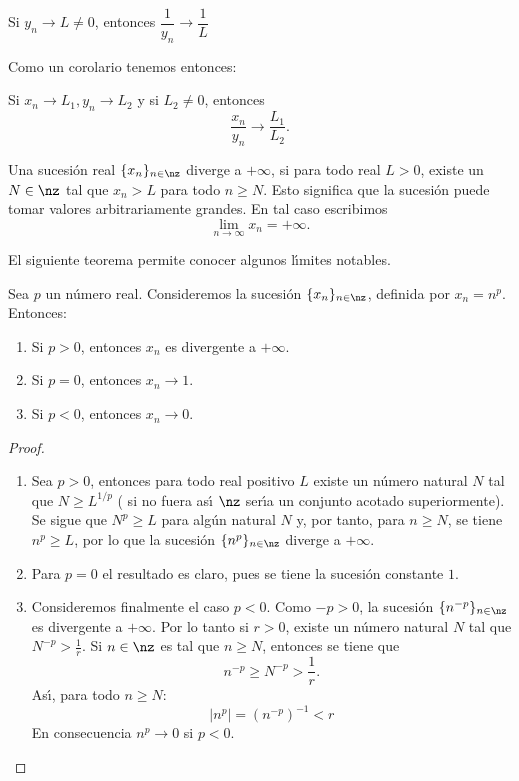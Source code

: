 \begin{theorem}
Si $y_{n}\rightarrow L\neq0$, entonces $\dfrac{1}{y_{n}}\rightarrow\dfrac
{1}{L}$
\end{theorem}

Como un corolario tenemos entonces:

\begin{corollary}
Si $x_{n}\to L_{1}, y_{n}\to L_{2}$ y si $L_{2}\neq0$, entonces
\[
\frac{x_{n}}{y_{n}}\to\frac{L_{1}}{L_{2}}.
\]

\end{corollary}

Una sucesi\'{o}n real $\{x_{n}\}_{n\in\nz}$ diverge a $+\infty$, si para todo
real $L>0$, existe un $N\in\nz$ tal que $x_{n}>L$ para todo $n\geq N$. Esto
significa que la sucesi\'{o}n puede tomar va\-lores arbitrariamente grandes.
En tal caso escribimos
\[
\lim_{n\rightarrow\infty}x_{n}=+\infty.
\]


El siguiente teorema permite conocer algunos l\'{\i}mites notables.

\begin{theorem}
\label{enealap} Sea $p$ un n\'{u}mero real. Consideremos la sucesi\'{o}n
$\{x_{n}\}_{n\in\nz}$, definida por $x_{n}=n^{p}$. Entonces:

\begin{enumerate}
\item Si $p>0$, entonces $x_{n}$ es divergente a $+\infty$.

\item Si $p=0$, entonces $x_{n}\rightarrow1$.

\item Si $p<0$, entonces $x_{n}\rightarrow0$.
\end{enumerate}
\end{theorem}

\begin{proof}
\begin{enumerate}
\item Sea $p>0$, entonces para todo real positivo $L$ existe un n\'{u}mero
natural $N$ tal que $N\geq L^{1/p}$ ( si no fuera as\'{\i} $\nz$ ser\'{\i}a un
conjunto acotado superiormente). Se sigue que $N^{p}\geq L$ para alg\'{u}n
natural $N$ y, por tanto, para $n\geq N$, se tiene $n^{p}\geq L$, por lo que
la sucesi\'{o}n $\{n^{p}\}_{n\in\nz}$ diverge a $+\infty$.

\item Para $p=0$ el resultado es claro, pues se tiene la sucesi\'{o}n
constante $1$.

\item Consideremos finalmente el caso $p<0$. Como $-p>0$, la sucesi\'{o}n
$\{n^{-p}\}_{n\in\nz}$ es divergente a $+\infty$. Por lo tanto si $r>0$,
existe un n\'{u}mero natural $N$ tal que $N^{-p}>\frac{1}{r}$. Si $n\in\nz$ es
tal que $n\geq N$, entonces se tiene que
\[
n^{-p}\geq N^{-p}>\frac{1}{r}.
\]
As\'{\i}, para todo $n\geq N$:
\[
|n^{p}|=(n^{-p})^{-1}<r
\]
En consecuencia $n^{p}\rightarrow0$ si $p<0$.
\end{enumerate}
\end{proof}

